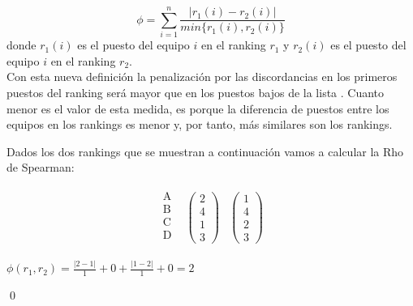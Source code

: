 \begin{equation} \label{spearman}
	\phi = \sum_{i=1}^{n} \dfrac{|r_{1}(i) - r_{2}(i)|}{min\{r_{1}(i),r_{2}(i)\}}
\end{equation}
donde $r_{1}(i)$ es el puesto del equipo $i$ en el ranking $r_{1}$ y $r_{2}(i)$ es el puesto del equipo $i$ en el ranking $r_{2}$.\\

Con esta nueva definición la penalización por las discordancias en los primeros puestos del ranking será mayor que en los puestos bajos de la lista \cite[pág 207]{comparacion}. Cuanto menor es el valor de esta medida, es porque la diferencia de puestos entre los equipos en los rankings es menor y, por tanto, más similares son los rankings.


\begin{ejem} Dados los dos rankings que se muestran a continuación vamos a calcular la Rho de Spearman:
\end{ejem}
\begin{center}
	\[
	\begin{array}{ccc}
	\begin{array}{c}
	\text{A}\\
	\text{B} \\
	\text{C} \\
	\text{D} \\
	\end{array} & \left(\begin{array}{c}
	2\\
	4\\
	1\\
	3
	\end{array} \right)& \left(\begin{array}{c}
	1\\
	4\\
	2\\
	3
	\end{array} \right)
	\end{array}  
	\]
	
	$ \phi (r_{1},r_{2}) = \frac{|2-1|}{1} + 0 + \frac{|1-2|}{1} + 0 = 2$
	
\end{center}

\qed